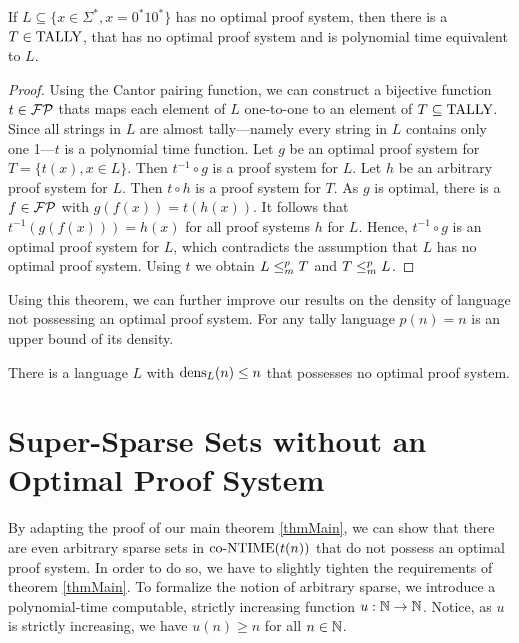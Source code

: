   \begin{theorem} \label{thmTally}
    If \(L \subseteq \{ x \in \Sigma^*, x = 0^*10^* \}\) has no optimal proof system, then there is a \(T \in \text{TALLY}\), that has no optimal proof system and is polynomial time equivalent to \(L\).
  \end{theorem}

  \begin{proof}
    Using the Cantor pairing function, we can construct a bijective function \(t \in \mathcal{FP}\) thats maps each element of \(L\) one-to-one to an element of \(T \subseteq \text{TALLY}\). Since all strings in \(L\) are almost tally---namely every string in \(L\) contains only one 1---\(t\) is a polynomial time function. Let \(g\) be an optimal proof system for \(T = \{ t(x), x \in L \}\). Then \(t^{-1} \circ g\) is a proof system for \(L\). Let \(h\) be an arbitrary proof system for \(L\). Then \(t \circ h\) is a proof system for \(T\). As \(g\) is optimal, there is a \(f \in \mathcal{FP}\) with \(g(f(x)) = t(h(x))\). It follows that \(t^{-1}(g(f(x))) = h(x)\) for all proof systems \(h\) for \(L\). Hence, \(t^{-1} \circ g\) is an optimal proof system for \(L\), which contradicts the assumption that \(L\) has no optimal proof system. Using \(t\) we obtain \(L \leq_{m}^{p} T\) and \(T \leq_{m}^{p} L\).
  \end{proof}
  
  Using this theorem, we can further improve our results on the density of language not possessing an optimal proof system. For any tally language \(p(n) = n\) is an upper bound of its density.

  \begin{corollary}
    There is a language \(L\) with \(\operatorname{dens}_L(n) \leq n\) that possesses no optimal proof system.
  \end{corollary}

  \section{Super-Sparse Sets without an Optimal Proof System}

  By adapting the proof of our main theorem \ref{thmMain}, we can show that there are even arbitrary sparse sets in \(\text{co-NTIME}(t(n))\) that do not possess an optimal proof system. In order to do so, we have to slightly tighten the requirements of theorem \ref{thmMain}. To formalize the notion of arbitrary sparse, we introduce a polynomial-time computable, strictly increasing function \(u : \mathbb{N} \to \mathbb{N}\). Notice, as \(u\) is strictly increasing, we have \(u(n) \geq n\) for all \(n \in \mathbb{N}\).

